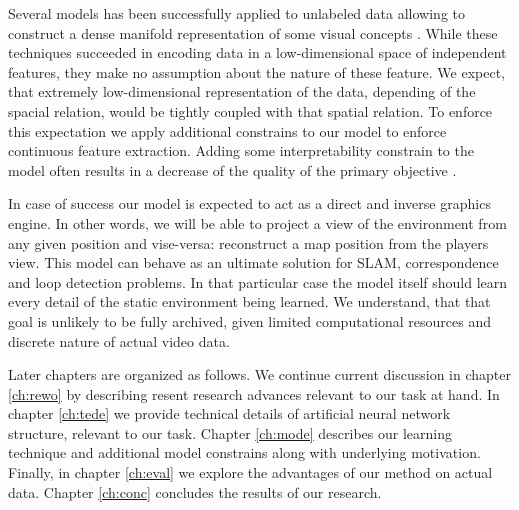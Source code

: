 Several models has been successfully applied to unlabeled data allowing to construct a dense manifold representation of some visual concepts \cite{Li2015, Kingma2013, Goodfellow2014}.
While these techniques succeeded in encoding data in a low-dimensional space of independent features, they make no assumption about the nature of these feature.
We expect, that extremely low-dimensional representation of the data, depending of the spacial relation, would be tightly coupled with that spatial relation.
To enforce this expectation we apply additional constrains to our model to enforce continuous feature extraction.
Adding some interpretability constrain to the model often results in a decrease of the quality of the primary objective \cite{Lei2016}.

In case of success our model is expected to act as a direct and inverse graphics engine.
In other words, we will be able to project a view of the environment from any given position and vise-versa: reconstruct a map position from the players view.
This model can behave as an ultimate solution for SLAM, correspondence and loop detection problems. In that particular case the model itself should learn every detail of the static environment being learned. We understand, that that goal is unlikely to be fully archived, given limited computational resources and discrete nature of actual video data.

Later chapters are organized as follows. We continue current discussion in chapter \ref{ch:rewo} by describing resent research advances relevant to our task at hand. In chapter \ref{ch:tede} we provide technical details of artificial neural network structure, relevant to our task. Chapter \ref{ch:mode} describes our learning technique and additional model constrains along with underlying motivation. Finally, in chapter \ref{ch:eval} we explore the advantages of our method on actual data. Chapter \ref{ch:conc} concludes the results of our research.
